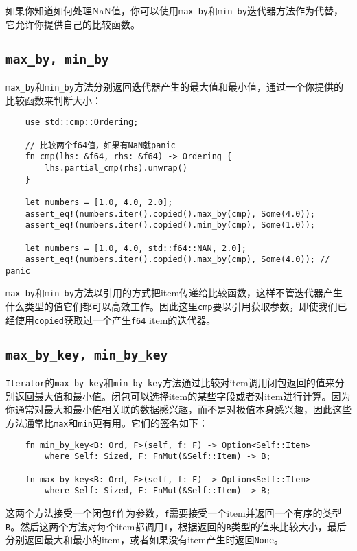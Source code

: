 如果你知道如何处理NaN值，你可以使用\texttt{max\_by}和\texttt{min\_by}迭代器方法作为代替，它允许你提供自己的比较函数。

\subsection{\texttt{max\_by, min\_by}}\label{MaxBy}
\texttt{max\_by}和\texttt{min\_by}方法分别返回迭代器产生的最大值和最小值，通过一个你提供的比较函数来判断大小：
\begin{verbatim}
    use std::cmp::Ordering;

    // 比较两个f64值，如果有NaN就panic
    fn cmp(lhs: &f64, rhs: &f64) -> Ordering {
        lhs.partial_cmp(rhs).unwrap()
    }
    
    let numbers = [1.0, 4.0, 2.0];
    assert_eq!(numbers.iter().copied().max_by(cmp), Some(4.0));
    assert_eq!(numbers.iter().copied().min_by(cmp), Some(1.0));

    let numbers = [1.0, 4.0, std::f64::NAN, 2.0];
    assert_eq!(numbers.iter().copied().max_by(cmp), Some(4.0)); // panic
\end{verbatim}

\texttt{max\_by}和\texttt{min\_by}方法以引用的方式把item传递给比较函数，这样不管迭代器产生什么类型的值它们都可以高效工作。因此这里\texttt{cmp}要以引用获取参数，即使我们已经使用\texttt{copied}获取过一个产生\texttt{f64} item的迭代器。

\subsection{\texttt{max\_by\_key, min\_by\_key}}
\texttt{Iterator}的\texttt{max\_by\_key}和\texttt{min\_by\_key}方法通过比较对item调用闭包返回的值来分别返回最大值和最小值。闭包可以选择item的某些字段或者对item进行计算。因为你通常对最大和最小值相关联的数据感兴趣，而不是对极值本身感兴趣，因此这些方法通常比\texttt{max}和\texttt{min}更有用。它们的签名如下：
\begin{verbatim}
    fn min_by_key<B: Ord, F>(self, f: F) -> Option<Self::Item>
        where Self: Sized, F: FnMut(&Self::Item) -> B;

    fn max_by_key<B: Ord, F>(self, f: F) -> Option<Self::Item>
        where Self: Sized, F: FnMut(&Self::Item) -> B;
\end{verbatim}

这两个方法接受一个闭包\texttt{f}作为参数，\texttt{f}需要接受一个item并返回一个有序的类型\texttt{B}。然后这两个方法对每个item都调用\texttt{f}，根据返回的\texttt{B}类型的值来比较大小，最后分别返回最大和最小的item，或者如果没有item产生时返回\texttt{None}。

